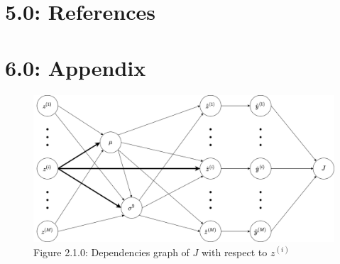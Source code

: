 \documentclass{article}
\begin{document}
\newpage
\section*{5.0: References}












\newpage
\section*{6.0: Appendix}
\begin{figure}[!ht]
    \captionsetup{labelformat=empty}
    \centering
    \includegraphics[scale=0.4]{Batch Norm dependencies graph.drawio.png}
    \caption{Figure 2.1.0: Dependencies graph of $J$ with respect to $z^{(i)}$}
\end{figure}
\end{document}
